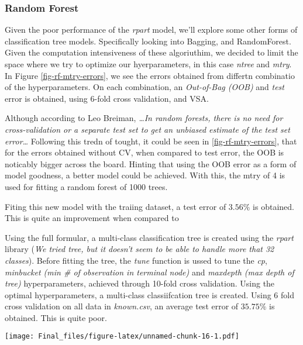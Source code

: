 \documentclass[]{article}
\let\origfigure\figure
\let\endorigfigure\endfigure
\renewenvironment{figure}[1][2] {
    \expandafter\origfigure\expandafter[H]
} {
    \endorigfigure
}
\begin{document}
\subsubsection{Random Forest}\label{random-forest}

Given the poor performance of the \emph{rpart} model, we'll explore some
other forms of classification tree models. Specifically looking into
Bagging, and RandomForest. Given the computation intensiveness of these
algoriuthim, we decided to limit the space where we try to optimize our
hyerparameters, in this case \emph{ntree} and \emph{mtry}. In Figure
\ref{fig-rf-mtry-errors}, we see the errors obtained from differtn
combinatio of the hyperparameters. On each combination, an
\emph{Out-of-Bag (OOB)} and \emph{test} error is obtained, using 6-fold
cross validation, and VSA.

Although according to Leo Breiman, \emph{\ldots{}In random forests,
there is no need for cross-validation or a separate test set to get an
unbiased estimate of the test set error\ldots{}} Following this tredn of
tought, it could be seen in \ref{fig-rf-mtry-errors}, that for the
errors obtained without CV, when compared to test error, the OOB is
noticably bigger across the board. Hinting that using the OOB error as a
form of model goodness, a better model could be achieved. With this, the
mtry of 4 is used for fitting a random forest of 1000 trees.

Fiting this new model with the traiing dataset, a test error of
\(3.56\%\) is obtained. This is quite an improvement when compared to

Using the full formular, a multi-class classification tree is created
using the \emph{rpart} library (\emph{We tried tree, but it doesn't seem
to be able to handle more that 32 classes}). Before fitting the tree,
the \emph{tune} function is ussed to tune the \emph{cp}, \emph{minbucket
(min \# of observation in terminal node)} and \emph{maxdepth (max depth
of tree)} hyperparameters, achieved through 10-fold cross validation.
Using the optimal hyperparameters, a multi-class classiifcation tree is
created. Using 6 fold cross validation on all data in \emph{known.csv},
an average test error of \(35.75\%\) is obtained. This is quite poor.

\begin{figure}
\centering
\texttt{[image: Final\_files/figure-latex/unnamed-chunk-16-1.pdf]}
\caption{Error rates accross mtry values\label{fig-rf-mtry-errors}}
\end{figure}
\end{document}
